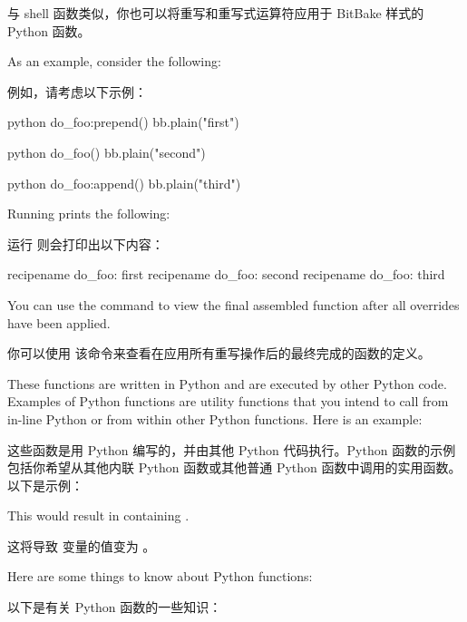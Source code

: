 与 shell 函数类似，你也可以将重写和重写式运算符应用于 BitBake 样式的 Python 函数。

As an example, consider the following:

例如，请考虑以下示例：

\begin{pyglist}
python do_foo:prepend() {
    bb.plain("first")
}

python do_foo() {
    bb.plain("second")
}

python do_foo:append() {
    bb.plain("third")
}
\end{pyglist}

Running  prints the following:

运行  则会打印出以下内容：

\begin{pyglist}
recipename do_foo: first
recipename do_foo: second
recipename do_foo: third
\end{pyglist}

You can use the  command to view the final assembled function after all overrides have been applied.

你可以使用  该命令来查看在应用所有重写操作后的最终完成的函数的定义。


These functions are written in Python and are executed by other Python code. Examples of Python functions are utility functions that you intend to call from in-line Python or from within other Python functions. Here is an example:

这些函数是用 Python 编写的，并由其他 Python 代码执行。Python 函数的示例包括你希望从其他内联 Python 函数或其他普通 Python 函数中调用的实用函数。以下是示例：


This would result in  containing .

这将导致  变量的值变为 。

Here are some things to know about Python functions:

以下是有关 Python 函数的一些知识：

